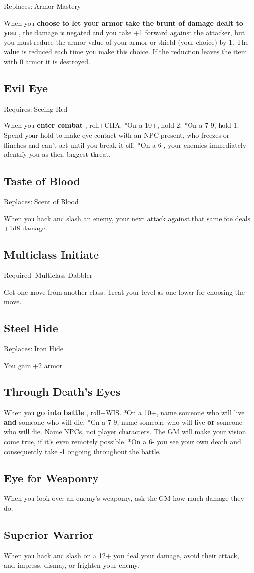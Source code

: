  Replaces: Armor Mastery


 When you \textbf{choose to let your armor take the brunt of damage dealt to you}
, the damage is negated and you take +1 forward against the attacker, but you must reduce the armor value of your armor or shield (your choice) by 1. The value is reduced each time you make this choice. If the reduction leaves the item with 0 armor it is destroyed.
\subsection{Evil Eye}


 Requires: Seeing Red


 When you \textbf{enter combat}
, roll+CHA. *On a 10+, hold 2. *On a 7-9, hold 1. Spend your hold to make eye contact with an NPC present, who freezes or flinches and can't act until you break it off. *On a 6-, your enemies immediately identify you as their biggest threat.
\subsection{Taste of Blood}


 Replaces: Scent of Blood


 When you hack and slash an enemy, your next attack against that same foe deals +1d8 damage.
\subsection{Multiclass Initiate}


 Required: Multiclass Dabbler


 Get one move from another class. Treat your level as one lower for choosing the move.
\subsection{Steel Hide}


 Replaces: Iron Hide


 You gain +2 armor.
\subsection{Through Death's Eyes}


 When you \textbf{go into battle}
, roll+WIS. *On a 10+, name someone who will live \textbf{and}
 someone who will die. *On a 7-9, name someone who will live \textbf{or}
 someone who will die. Name NPCs, not player characters. The GM will make your vision come true, if it's even remotely possible. *On a 6- you see your own death and consequently take -1 ongoing throughout the battle.
\subsection{Eye for Weaponry}


 When you look over an enemy's weaponry, ask the GM how much damage they do.
\subsection{Superior Warrior}


 When you hack and slash on a 12+ you deal your damage, avoid their attack, and impress, dismay, or frighten your enemy.


